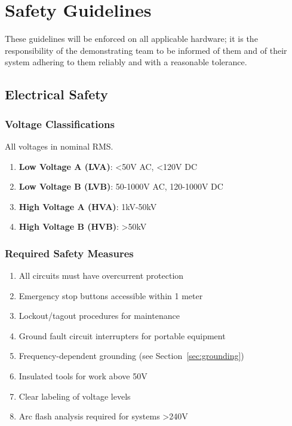 
\section{Safety Guidelines}

These guidelines will be enforced on all applicable hardware; it is the responsibility of the demonstrating team to be informed of them and of their system adhering to them reliably and with a reasonable tolerance.

\subsection{Electrical Safety}

\subsubsection{Voltage Classifications}
All voltages in nominal RMS.
\begin{enumerate}[noitemsep]
    \item \textbf{Low Voltage A (LVA)}: <50V AC, <120V DC
    \item \textbf{Low Voltage B (LVB)}: 50-1000V AC, 120-1000V DC
    \item \textbf{High Voltage A (HVA)}: 1kV-50kV
    \item \textbf{High Voltage B (HVB)}: >50kV
\end{enumerate}

\subsubsection{Required Safety Measures}
\begin{enumerate}[noitemsep]
    \item All circuits must have overcurrent protection
    \item Emergency stop buttons accessible within 1 meter
    \item Lockout/tagout procedures for maintenance  
    \item Ground fault circuit interrupters for portable equipment
    \item Frequency-dependent grounding (see Section~\ref{sec:grounding})
    \item Insulated tools for work above 50V
    \item Clear labeling of voltage levels
    \item Arc flash analysis required for systems >240V
\end{enumerate}

